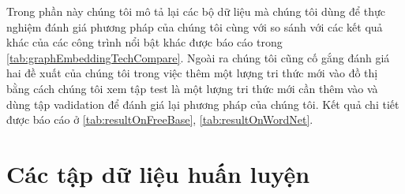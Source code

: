 Trong phần này chúng tôi mô tả lại các bộ dữ liệu mà chúng tôi dùng để thực nghiệm đánh giá phương pháp của chúng tôi cùng với so sánh với các kết quả khác của các công trình nổi bật khác được báo cáo trong \autoref{tab:graphEmbeddingTechCompare}. Ngoài ra chúng tôi cũng cố gắng đánh giá hai đề xuất của chúng tôi trong việc thêm một lượng tri thức mới vào đồ thị bằng cách chúng tôi xem tập test là một lượng tri thức mới cần thêm vào và dùng tập vadidation để đánh giá lại phương pháp của chúng tôi. Kết quả chi tiết được báo cáo ở \autoref{tab:resultOnFreeBase}, \autoref{tab:resultOnWordNet}.

\begin{table}[htbp]
	\begin{center}
		\caption{Thông tin các tập dữ liệu}
		\label{tab:datasetInfo}
	\end{center}
\end{table}

\section{Các tập dữ liệu huấn luyện}
\label{sec:DataTraining}

